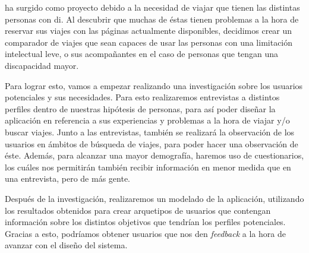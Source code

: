 
\textit{\app} ha surgido como proyecto debido a la necesidad de viajar que tienen las distintas personas con \gls{di}. Al
descubrir que muchas de éstas tienen problemas a la hora de reservar sus viajes con las páginas actualmente disponibles, decidimos crear un 
comparador de viajes que sean capaces de usar las personas con una limitación intelectual leve, o sus acompañantes en el caso de personas que
tengan una discapacidad mayor. 

Para lograr esto, vamos a empezar realizando una investigación sobre los usuarios potenciales y sus necesidades. Para esto realizaremos entrevistas
a distintos perfiles dentro de nuestras hipótesis de personas, para así poder diseñar la aplicación en referencia a sus experiencias y problemas a la hora
de viajar y/o buscar viajes. Junto a las entrevistas, también se realizará la observación de los usuarios en ámbitos de búsqueda de viajes, para poder hacer
una observación de éste. Además, para alcanzar una mayor demografía, haremos uso de cuestionarios, los cuáles nos permitirán también recibir información
en menor medida que en una entrevista, pero de más gente.

Después de la investigación, realizaremos un modelado de la aplicación, utilizando los resultados obtenidos para crear arquetipos de usuarios que
contengan información sobre los distintos objetivos que tendrían los perfiles potenciales. Gracias a esto, podríamos obtener usuarios que nos den
\textit{feedback} a la hora de avanzar con el diseño del sistema.
